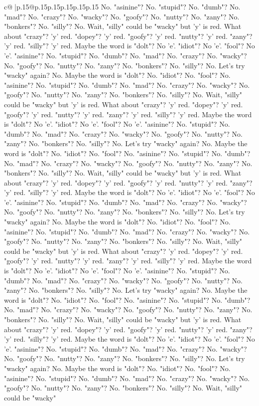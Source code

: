 \documentclass{article}
\begin{document}
{\begin{supertabular}{c@{$\;$}|p{.15\linewidth}@{}p{.15\linewidth}p{.15\linewidth}p{.15\linewidth}p{.15\linewidth}p{.15\linewidth}}
{{{No. "asinine"? No. "stupid"? No. "dumb"? No. "mad"? No. "crazy"? No. "wacky"? No. "goofy"? No. "nutty"? No. "zany"? No. "bonkers"? No. "silly"? No. Wait, "silly" could be "wacky" but 'y' is red. What about "crazy"? 'y' red. "dopey"? 'y' red. "goofy"? 'y' red. "nutty"? 'y' red. "zany"? 'y' red. "silly"? 'y' red. Maybe the word is "dolt"? No 'e'. "idiot"? No 'e'. "fool"? No 'e'. "asinine"? No. "stupid"? No. "dumb"? No. "mad"? No. "crazy"? No. "wacky"? No. "goofy"? No. "nutty"? No. "zany"? No. "bonkers"? No. "silly"? No. Let's try "wacky" again? No. Maybe the word is "dolt"? No. "idiot"? No. "fool"? No. "asinine"? No. "stupid"? No. "dumb"? No. "mad"? No. "crazy"? No. "wacky"? No. "goofy"? No. "nutty"? No. "zany"? No. "bonkers"? No. "silly"? No. Wait, "silly" could be "wacky" but 'y' is red. What about "crazy"? 'y' red. "dopey"? 'y' red. "goofy"? 'y' red. "nutty"? 'y' red. "zany"? 'y' red. "silly"? 'y' red. Maybe the word is "dolt"? No 'e'. "idiot"? No 'e'. "fool"? No 'e'. "asinine"? No. "stupid"? No. "dumb"? No. "mad"? No. "crazy"? No. "wacky"? No. "goofy"? No. "nutty"? No. "zany"? No. "bonkers"? No. "silly"? No. Let's try "wacky" again? No. Maybe the word is "dolt"? No. "idiot"? No. "fool"? No. "asinine"? No. "stupid"? No. "dumb"? No. "mad"? No. "crazy"? No. "wacky"? No. "goofy"? No. "nutty"? No. "zany"? No. "bonkers"? No. "silly"? No. Wait, "silly" could be "wacky" but 'y' is red. What about "crazy"? 'y' red. "dopey"? 'y' red. "goofy"? 'y' red. "nutty"? 'y' red. "zany"? 'y' red. "silly"? 'y' red. Maybe the word is "dolt"? No 'e'. "idiot"? No 'e'. "fool"? No 'e'. "asinine"? No. "stupid"? No. "dumb"? No. "mad"? No. "crazy"? No. "wacky"? No. "goofy"? No. "nutty"? No. "zany"? No. "bonkers"? No. "silly"? No. Let's try "wacky" again? No. Maybe the word is "dolt"? No. "idiot"? No. "fool"? No. "asinine"? No. "stupid"? No. "dumb"? No. "mad"? No. "crazy"? No. "wacky"? No. "goofy"? No. "nutty"? No. "zany"? No. "bonkers"? No. "silly"? No. Wait, "silly" could be "wacky" but 'y' is red. What about "crazy"? 'y' red. "dopey"? 'y' red. "goofy"? 'y' red. "nutty"? 'y' red. "zany"? 'y' red. "silly"? 'y' red. Maybe the word is "dolt"? No 'e'. "idiot"? No 'e'. "fool"? No 'e'. "asinine"? No. "stupid"? No. "dumb"? No. "mad"? No. "crazy"? No. "wacky"? No. "goofy"? No. "nutty"? No. "zany"? No. "bonkers"? No. "silly"? No. Let's try "wacky" again? No. Maybe the word is "dolt"? No. "idiot"? No. "fool"? No. "asinine"? No. "stupid"? No. "dumb"? No. "mad"? No. "crazy"? No. "wacky"? No. "goofy"? No. "nutty"? No. "zany"? No. "bonkers"? No. "silly"? No. Wait, "silly" could be "wacky" but 'y' is red. What about "crazy"? 'y' red. "dopey"? 'y' red. "goofy"? 'y' red. "nutty"? 'y' red. "zany"? 'y' red. "silly"? 'y' red. Maybe the word is "dolt"? No 'e'. "idiot"? No 'e'. "fool"? No 'e'. "asinine"? No. "stupid"? No. "dumb"? No. "mad"? No. "crazy"? No. "wacky"? No. "goofy"? No. "nutty"? No. "zany"? No. "bonkers"? No. "silly"? No. Let's try "wacky" again? No. Maybe the word is "dolt"? No. "idiot"? No. "fool"? No. "asinine"? No. "stupid"? No. "dumb"? No. "mad"? No. "crazy"? No. "wacky"? No. "goofy"? No. "nutty"? No. "zany"? No. "bonkers"? No. "silly"? No. Wait, "silly" could be "wacky" }}}
\end{supertabular}}
\end{document}
